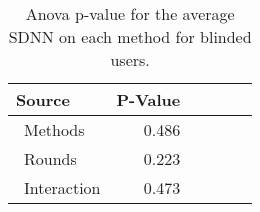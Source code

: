 
\begin{table}[!htb]
\centering
\caption{Anova p-value for the average SDNN on each method for blinded users.}
\label{tab:blocdanova_sdnn_two_way_blind}
\begin{tabular}{lrrrrr}
\toprule
          Source & P-Value \\
\midrule
    \    Methods &   0.486 \\
     \    Rounds &   0.223 \\
\    Interaction &   0.473 \\
\bottomrule
\end{tabular}
\end{table}

